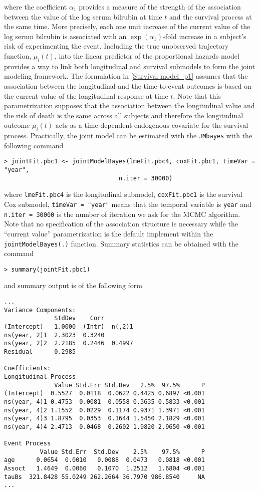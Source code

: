 \documentclass[12pt]{article}
\begin{document}
where the coefficient $\alpha_1$ provides a measure of the strength of the association between the value of the log serum bilrubin at time $t$ and the survival process at the same time. More precisely, each one unit increase of the current value of the log serum bilrubin is associated with an $\exp (\alpha_1)$-fold increase in a subject's risk of experimenting the event. Including the true unobserved trajectory function, $\mu_i(t)$, into the linear predictor of the proportional hazards model provides a way to link both longitudinal and survival submodels to form the joint modeling framework. The formulation in \eqref{Survival model_p1} assumes that the association between the longitudinal and the time-to-event outcomes is based on the current value of the longitudinal response at time $t$. Note that this parametrization supposes that the association between the longitudinal value and the risk of death is the same across all subjects and therefore the longitudinal outcome $\mu_i(t)$ acts as a time-dependent endogenous covariate for the survival process. Practically, the joint model can be estimated with the \texttt{JMbayes} with the following command
\begin{verbatim}
> jointFit.pbc1 <- jointModelBayes(lmeFit.pbc4, coxFit.pbc1, timeVar = "year", 
                                n.iter = 30000)\end{verbatim}
where \texttt{lmeFit.pbc4} is the longitudinal submodel, \texttt{coxFit.pbc1} is the survival Cox submodel, \texttt{timeVar = "year"} means that the temporal variable is \texttt{year} and \texttt{n.iter = 30000} is the number of iteration we ask for the MCMC algorithm. Note that no specification of the association structure is necessary while the ``current value'' parametrization is the default implement within the \texttt{jointModelBayes(.)} function.
Summary statistics can be obtained with the command
\begin{verbatim}
> summary(jointFit.pbc1)
\end{verbatim}
and summary output is of the following form
\begin{verbatim}
...
Variance Components:
              StdDev    Corr        
(Intercept)   1.0000  (Intr)  n(,2)1
ns(year, 2)1  2.3023  0.3240        
ns(year, 2)2  2.2185  0.2446  0.4997
Residual      0.2985                

Coefficients:
Longitudinal Process
              Value Std.Err Std.Dev   2.5%  97.5%      P
(Intercept)  0.5527  0.0118  0.0622 0.4425 0.6897 <0.001
ns(year, 4)1 0.4753  0.0081  0.0558 0.3635 0.5833 <0.001
ns(year, 4)2 1.1552  0.0229  0.1174 0.9371 1.3971 <0.001
ns(year, 4)3 1.8795  0.0353  0.1644 1.5450 2.1829 <0.001
ns(year, 4)4 2.4713  0.0468  0.2602 1.9820 2.9650 <0.001

Event Process
          Value Std.Err  Std.Dev    2.5%    97.5%      P
age      0.0654  0.0010   0.0088  0.0473   0.0818 <0.001
Assoct   1.4649  0.0060   0.1070  1.2512   1.6804 <0.001
tauBs  321.8428 55.0249 262.2664 36.7970 986.8540     NA
...
\end{verbatim}
\end{document}
